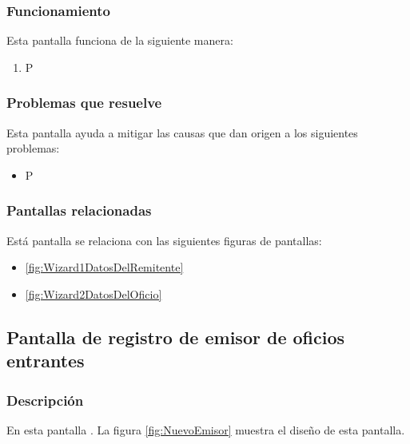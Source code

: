 \subsubsection{Funcionamiento}
	Esta pantalla funciona de la siguiente manera:
	
	\begin{enumerate}
		\item P
	\end{enumerate}

\subsubsection{Problemas que resuelve}
Esta pantalla ayuda a mitigar las causas que dan origen a los siguientes problemas:

	\begin{itemize}
		\item P
	\end{itemize}

\subsubsection{Pantallas relacionadas}
Está pantalla se relaciona con las siguientes figuras de pantallas:
	\begin{itemize}
		\item \ref{fig:Wizard1DatosDelRemitente}
		\item \ref{fig:Wizard2DatosDelOficio}
	\end{itemize}

\subsection{Pantalla de registro de emisor de oficios entrantes}
\subsubsection{Descripción}
	En esta pantalla . La figura \ref{fig:NuevoEmisor} muestra el diseño de esta pantalla.		
		
